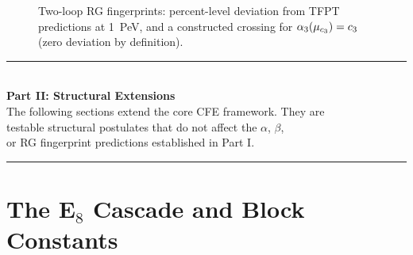 \begin{figure}[H]
\centering
{}
\caption{Two-loop RG fingerprints: percent-level deviation from TFPT predictions at 1~PeV, and a constructed crossing for $\alpha_3(\mu_{c_3})=c_3$ (zero deviation by definition).}
\label{fig:twoloop}
\end{figure}

\vspace{1em}
\begin{center}
\rule{0.8\textwidth}{0.5pt}\\[0.5em]
{\Large\bfseries Part II: Structural Extensions}\\[0.3em]
{\small The following sections extend the core CFE framework. They are \\
testable structural postulates that do not affect the $\alpha$, $\beta$, \\
or RG fingerprint predictions established in Part I.}\\[0.5em]
\rule{0.8\textwidth}{0.5pt}
\end{center}
\vspace{1em}

\section{\texorpdfstring{The E$_8$ Cascade and Block Constants}{The E8 Cascade and Block Constants}}
\label{sec:e8}

